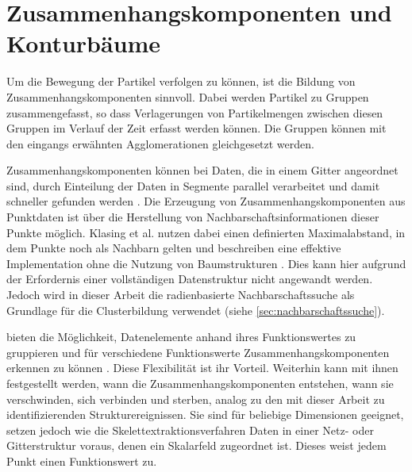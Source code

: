 

\section{Zusammenhangskomponenten und Konturbäume}\label{sec:related:connectedContour}

Um die Bewegung der Partikel verfolgen zu können, ist die Bildung von Zusammenhangskomponenten sinnvoll. Dabei werden Partikel zu Gruppen zusammengefasst, so dass Verlagerungen von Partikelmengen zwischen diesen Gruppen im Verlauf der Zeit erfasst werden können. Die Gruppen können mit den eingangs erwähnten Agglomerationen gleichgesetzt werden.

Zusammenhangskomponenten können bei Daten, die in einem Gitter angeordnet sind, durch Einteilung der Daten in Segmente parallel verarbeitet und damit schneller gefunden werden \cite{trevor2013efficient}. Die Erzeugung von Zusammenhangskomponenten aus Punktdaten ist über die Herstellung von Nachbarschaftsinformationen dieser Punkte möglich. Klasing et al. nutzen dabei einen definierten Maximalabstand, in dem Punkte noch als Nachbarn gelten und beschreiben eine effektive Implementation ohne die Nutzung von Baumstrukturen \cite{klasing2008efficientSegmentationOf3DLaserData}. Dies kann hier aufgrund der Erfordernis einer vollständigen Datenstruktur nicht angewandt werden. Jedoch wird in dieser Arbeit die radienbasierte Nachbarschaftssuche als Grundlage für die Clusterbildung verwendet (siehe \autoref{sec:nachbarschaftssuche}).

 bieten die Möglichkeit, Datenelemente anhand ihres Funktionswertes zu gruppieren und für verschiedene Funktionswerte Zusammenhangskomponenten erkennen zu können \cite{vanKreveld1997isosurfaceTraversal} \cite{bajaj1997contourSpectrum}. Diese Flexibilität ist ihr Vorteil. Weiterhin kann mit ihnen festgestellt werden, wann die Zusammenhangskomponenten entstehen, wann sie verschwinden, sich verbinden und sterben, analog zu den mit dieser Arbeit zu identifizierenden Strukturereignissen.
Sie sind für beliebige Dimensionen geeignet, setzen jedoch wie die Skelettextraktionsverfahren Daten in einer Netz- oder Gitterstruktur voraus, denen ein Skalarfeld zugeordnet ist. Dieses weist jedem Punkt einen Funktionswert zu.

